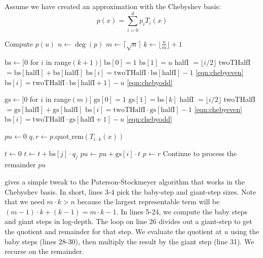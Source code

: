 \documentclass[../fheimpl.tex]{subfiles}
\begin{document}
Assume we have created an approximation with the Chebyshev basis:
\[p(x)=\sum_{i=0}^d p_iT_i(x)\]

\begin{algorithm}
	\caption{Simple Paterson-Stockmeyer in Chebyshev Basis}\label{alg:chebyps}
	\begin{algorithmic}[1]
		\Comment Compute $p(u)$
		\State $n \gets \deg(p)$
		\State $m \gets \lceil\sqrt{n}\rceil$
		\State $k \gets \lfloor \frac{n}{m}\rfloor + 1$
		
		\State $\mathrm{bs} \gets [0$ for $i$ in range$(k+1)]$
		\State $\mathrm{bs}[0] = 1$
		\State $\mathrm{bs}[1] = u$
			\State halfI $=\lfloor i / 2\rfloor$
			\State twoTHalfI $= \mathrm{bs}[\mathrm{halfI}] + \mathrm{bs}[\mathrm{halfI}]$
				\State $\mathrm{bs}[i] = \mathrm{twoTHalfI}\cdot \mathrm{bs}[\mathrm{halfI}] - 1$
				\Comment \cref{eqn:chebyeven}
			\Else
				\State $\mathrm{bs}[i] = \mathrm{twoTHalfI}\cdot \mathrm{bs}[\mathrm{halfI}+1] - u$
				\Comment \cref{eqn:chebyodd}
			\EndIf
		\EndFor
		
		\State $\mathrm{gs} \gets [0$ for $i$ in range$(m)]$
		\State $\mathrm{gs}[0] = 1$
		\State $\mathrm{gs}[1] = \textrm{bs}[k]$
		\State halfI $=\lfloor i / 2\rfloor$
		\State twoTHalfI $= \mathrm{gs}[\mathrm{halfI}] + \mathrm{gs}[\mathrm{halfI}]$
		\State $\mathrm{bs}[i] = \mathrm{twoTHalfI}\cdot \mathrm{gs}[\mathrm{halfI}] - 1$
		\Comment \cref{eqn:chebyeven}
		\Else
		\State $\mathrm{bs}[i] = \mathrm{twoTHalfI}\cdot \mathrm{gs}[\mathrm{halfI}+1] - u$
		\Comment \cref{eqn:chebyodd}
		\EndIf
		\EndFor
		
		\State $pu \gets 0$
			\State $q, r \gets p.\text{quot\_rem}(T_{i\cdot k}(x))$
			
			
			\State $t \gets 0$
				\State $t \gets t + \mathrm{bs}[j]\cdot q_j$
			\EndFor
			\State $pu \gets pu + \mathrm{gs}[i]\cdot t$
			\State $p \gets r$
			\Comment Continue to process the remainder
		\EndFor
		\State \Return $pu$
		\EndProcedure
	\end{algorithmic}
\end{algorithm}

 gives a simple tweak to the Paterson-Stockmeyer algorithm that works in the Chebyshev basis. In short, lines 3-4 pick the baby-step and giant-step sizes. Note that we need $m\cdot k > n$ because the largest representable term will be $(m-1)\cdot k + (k-1) = m\cdot k - 1$. In lines 5-24, we compute the baby steps and giant steps in log-depth. The loop on line 26 divides out a giant-step to get the quotient and remainder for that step. We evaluate the quotient at $u$ using the baby steps (lines 28-30), then multiply the result by the giant step (line 31). We recurse on the remainder.
\end{document}
